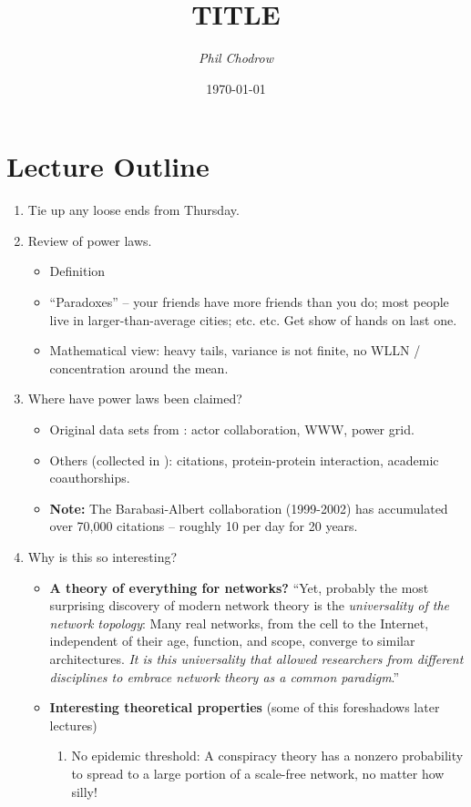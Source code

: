 \documentclass[english]{scrartcl}
\title{TITLE}
\author{\emph{Phil Chodrow}}
\date{\today}
\begin{document}

\section{Lecture Outline}
\begin{enumerate}
	\item Tie up any loose ends from Thursday. 
	\item Review of power laws. 
	\begin{itemize}
		\item Definition
		\item ``Paradoxes'' -- your friends have more friends than you do; most people live in larger-than-average cities; etc. etc. Get show of hands on last one. 
		\item Mathematical view: heavy tails, variance is not finite, no WLLN / concentration around the mean. 
	\end{itemize}
	\item Where have power laws been claimed? 
		\begin{itemize}
			\item Original data sets from \cite{Barabasi1999}: actor collaboration, WWW, power grid. 
			\item Others (collected in \cite{Albert2002}): citations, protein-protein interaction, academic coauthorships. 
			\item \textbf{Note:} The Barabasi-Albert collaboration (1999-2002) has accumulated over 70,000 citations -- roughly 10 per day for 20 years. 
		\end{itemize}
	\item Why is this so interesting? 
	\begin{itemize}
		\item \textbf{A theory of everything for networks?} ``Yet, probably the most surprising discovery of modern network theory is the \emph{universality of the network topology}: Many real networks, from the cell to the Internet, independent of their age, function, and scope, converge to similar architectures. \emph{It is this universality that allowed researchers from different disciplines to embrace network theory as a common paradigm}.'' \cite{Barabasi2009}
		\item \textbf{Interesting theoretical properties} (some of this foreshadows later lectures)
		\begin{enumerate}
			\item No epidemic threshold: A conspiracy theory has a nonzero probability to spread to a large portion of a scale-free network, no matter how silly! 

\end{enumerate}
\end{itemize}
\end{enumerate}
\end{document}
